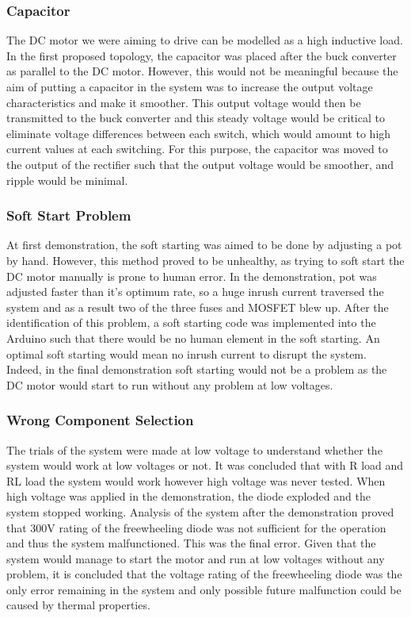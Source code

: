 \documentclass[12pt]{article}
\begin{document}
\subsubsection*{Capacitor}
The DC motor we were aiming to drive can be modelled as a high inductive load. In the first proposed topology, the capacitor was placed after the buck converter as parallel to the DC motor. However, this would not be meaningful because the aim of putting a capacitor in the system was to increase the output voltage characteristics and make it smoother. This output voltage would then be transmitted to the buck converter and this steady voltage would be critical to eliminate voltage differences between each switch, which would amount to high current values at each switching. For this purpose, the capacitor was moved to the output of the rectifier such that the output voltage would be smoother, and ripple would be minimal.
\subsubsection{Soft Start Problem}
At first demonstration, the soft starting was aimed to be done by adjusting a pot by hand. However, this method proved to be unhealthy, as trying to soft start the DC motor manually is prone to human error. In the demonstration, pot was adjusted faster than it’s optimum rate, so a huge inrush current traversed the system and as a result two of the three fuses and MOSFET blew up. After the identification of this problem, a soft starting code was implemented into the Arduino such that there would be no human element in the soft starting. An optimal soft starting would mean no inrush current to disrupt the system. Indeed, in the final demonstration soft starting would not be a problem as the DC motor would start to run without any problem at low voltages.
\subsubsection{Wrong Component Selection}
The trials of the system were made at low voltage to understand whether the system would work at low voltages or not. It was concluded that with R load and RL load the system would work however high voltage was never tested. When high voltage was applied in the demonstration, the diode exploded and the system stopped working. Analysis of the system after the demonstration proved that 300V rating of the freewheeling diode was not sufficient for the operation and thus the system malfunctioned. This was the final error. Given that the system would manage to start the motor and run at low voltages without any problem, it is concluded that the voltage rating of the freewheeling diode was the only error remaining in the system and only possible future malfunction could be caused by thermal properties.
\end{document}
